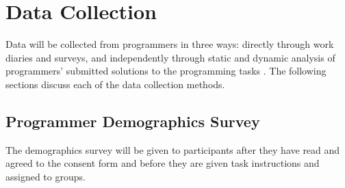 








\section{Data Collection}

Data will be collected from programmers in three ways: directly through work diaries and surveys, and independently through static and dynamic analysis of programmers' submitted solutions to the programming tasks \cite{singer2008a-software}.  The following sections discuss each of the data collection methods.

\subsection{Programmer Demographics Survey}

The demographics survey will be given to participants after they have read and agreed to the consent form and before they are given task instructions and assigned to groups.


